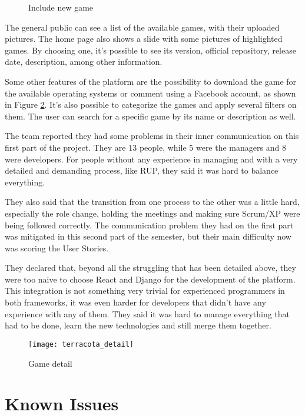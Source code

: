 \begin{figure}[h!]
\centering
{}
\caption{Include new game}
\label {fig:include_game1}
\end{figure}

The general public can see a list of the available games, with their uploaded pictures. The home page also shows a slide with some pictures of highlighted games. By choosing one, it's possible to see its version, official repository, release date, description, among other information.

Some other features of the platform are the possibility to download the game for the available operating systems or comment using a Facebook account, as shown in Figure \ref{fig:game_detail}. It's also possible to categorize the games and apply several filters on them. The user can search for a specific game by its name or description as well.

The team reported they had some problems in their inner communication on this first part of the project. They are 13 people, while 5 were the managers and 8 were developers. For people without any experience in managing and with a very detailed and demanding process, like RUP, they said it was hard to balance everything.

They also said that the transition from one process to the other was a little hard, especially the role change, holding the meetings and making sure Scrum/XP were being followed correctly. The communication problem they had on the first part was mitigated in this second part of the semester, but their main difficulty now was scoring the User Stories.

They declared that, beyond all the struggling that has been detailed above, they were too naive to choose React and Django for the development of the platform. This integration is not something very trivial for experienced programmers in both frameworks, it was even harder for developers that didn't have any experience with any of them. They said it was hard to manage everything that had to be done, learn the new technologies and still merge them together.


\begin{figure}[h!]
\centering
\texttt{[image: terracota\_detail]}
\caption{Game detail}
\label {fig:game_detail}
\end{figure}

\section{Known Issues}
\label {sec:issues}


